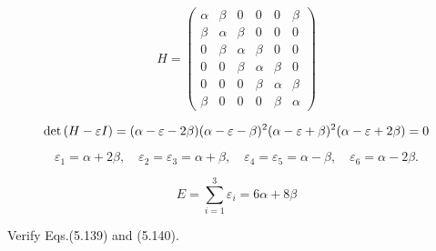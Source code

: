 \documentclass[a4paper]{book}
\newcounter{exercise}[chapter]
\newcounter{solution}[chapter]
\renewcommand\det[1]{{\rm det}\left(#1\right)}
\begin{document}
	\begin{solution}
	
	\[
		H = \begin{pmatrix}
		\alpha	& \beta	&	0	&	0	&	0	& \beta \\
		\beta	& \alpha& \beta & 	0	& 	0 	& 0   	\\
		0		& \beta	& \alpha& \beta	& 	0 	& 0   	\\
		0		&	0	& \beta	& \alpha& \beta	& 0   	\\
		0		&	0	& 	0	& \beta	& \alpha& \beta	\\
		\beta	&	0	& 	0	&	0	& \beta	& \alpha
		\end{pmatrix}
	\]	
	
	\[
		\det{H - \varepsilon I} = ( \alpha - \varepsilon - 2\beta ) ( \alpha - \varepsilon - \beta )^2 ( \alpha - \varepsilon + \beta )^2 ( \alpha - \varepsilon + 2\beta ) = 0
	\]	
	
	\[
		\varepsilon_1 = \alpha + 2 \beta , \quad \varepsilon_2 = \varepsilon_3 = \alpha + \beta , \quad \varepsilon_4 = \varepsilon_5 = \alpha - \beta , \quad \varepsilon_6 = \alpha - 2 \beta .
	\]
	
	\begin{equation}
		E = \sum_{i=1}^3 \varepsilon_i = 6 \alpha + 8 \beta
	\end{equation}
	
	\end{solution}
	
	\begin{exercise}
	Verify Eqs.(5.139) and (5.140).
	\end{exercise}
	
\end{document}

